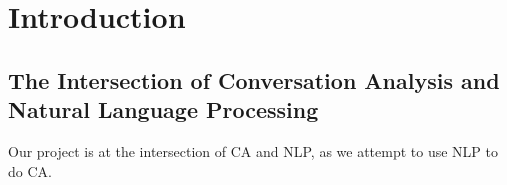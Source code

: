 \chapter{Introduction}
\section{The Intersection of Conversation Analysis and Natural Language Processing}
Our project is at the intersection of CA and NLP, as we attempt to use NLP to do CA.


